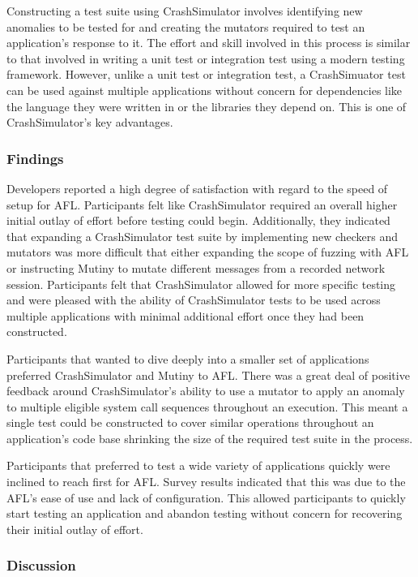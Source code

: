 Constructing a test suite using CrashSimulator involves identifying new
anomalies to be tested for and creating the mutators required
to test an application's response to it.  The effort and skill involved in
this process is similar to that involved in writing a unit test or
integration test using a modern testing framework.  However, unlike a unit
test or integration test, a CrashSimuator test can be used against multiple
applications without concern for dependencies like the language they were
written in or the libraries they depend on.  This is one of
CrashSimulator's key advantages.


\subsubsection{Findings}


Developers reported a high degree of satisfaction with regard to the speed
of setup for AFL.  Participants felt like CrashSimulator required an
overall higher initial outlay of effort before testing could begin.
Additionally, they indicated that expanding a CrashSimulator test suite by
implementing new checkers and mutators was more difficult that either
expanding the scope of fuzzing with AFL or instructing Mutiny to mutate
different messages from a recorded network session.  Participants felt that
CrashSimulator allowed for more specific testing and were pleased with the
ability of CrashSimulator tests to be used across multiple applications
with minimal additional effort once they had been constructed.

Participants that wanted to dive deeply into a smaller set of applications
preferred CrashSimulator and Mutiny to AFL.  There was a great deal of
positive feedback around CrashSimulator's ability to use a mutator to apply
an anomaly to multiple eligible system call sequences throughout an
execution.  This meant a single test could be constructed to cover similar
operations throughout an application's code base shrinking the size of the
required test suite in the process.

Participants that preferred to test a wide variety of applications quickly
were inclined to reach first for AFL.  Survey results indicated that this
was due to the AFL's ease of use and lack of configuration.  This allowed
participants to quickly start testing an application and abandon testing
without concern for recovering their initial outlay of effort.


\subsubsection{Discussion}

